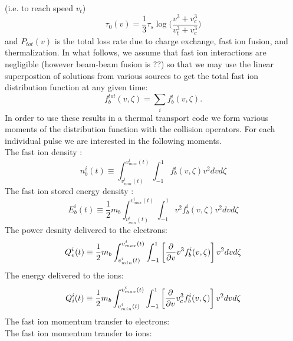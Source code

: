 (i.e. to reach speed $v_t$) 
\begin{equation} 
 \tau_0(v)=
 \frac{1}{3}\tau_s\log\biggl(\frac{v^3+v_c^3}{v_t^3+v_c^3}\biggr) 
 \label{eq:wav4}
\end{equation}
and $P_{tot}(v) $ is the total loss rate due to charge exchange, fast ion
fusion, and thermalization. In what follows, we assume that fast ion
interactions are negligible (however beam-beam fusion is ??)   so that we may
use the linear superpostion of solutions from various sources to get the total
fast ion distribution function at any given time:
\begin{equation}
 f_b^{tot}(v,\zeta) = \sum_{i}f_b^i(v,\zeta).
 \label{eq:wav4a}
\end{equation} 
In order to use these results in a thermal transport code
we form various moments of the distribution function with 
the collision operators. For each individual pulse we are
interested in the following moments. \\
The fast ion density :
\begin{equation}
 n_b^i(t) \equiv \int_{v_{min}^i(t)}^{v_{max}^i(t)}
 \int_{-1}^{1} 
 f_b^i(v,\zeta)
 v^2dvd\zeta   
 \label{eq:wav5a}
\end{equation}
The fast ion stored energy density :
\begin{equation}
 E_b^i(t) \equiv \frac{1}{2}m_b\int_{v_{min}^i(t)}^{v_{max}^i(t)}
 \int_{-1}^{1} 
 v^2 f_b^i(v,\zeta)
 v^2dvd\zeta   
 \label{eq:wav5b}
\end{equation}
The power desnity delivered to the electrons:
\begin{equation}
 Q_e^i(t) \equiv \frac{1}{2}m_b\int_{v_{min}^i(t)}^{v_{max}^i(t)}
 \int_{-1}^{1} 
 \left[\frac{\partial}{\partial v}{v^3 f_b^i(v,\zeta)}\right]
 v^2dvd\zeta   
 \label{eq:wav5c}
\end{equation}
The energy delivered to the ions:
\begin{equation}
 Q_i^i(t) 
 \equiv \frac{1}{2}m_b \int_{v_{min}^i(t)}^{v_{max}^i(t)}
 \int_{-1}^{1} 
 \left[\frac{\partial}{\partial v}{v_c^3 f_b^i(v,\zeta)}\right]
 v^2dvd\zeta   
 \label{eq:wav5d}
\end{equation}
The fast ion momentum transfer to electrons:\\
The fast ion momentum transfer to ions:\\
